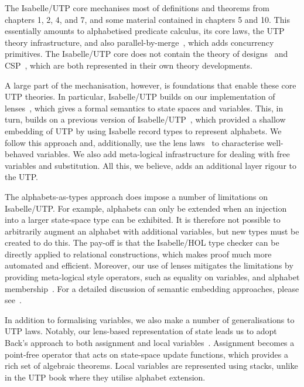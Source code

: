 \documentclass[11pt,a4paper]{article}
\begin{document}
The Isabelle/UTP core mechanises most of definitions and theorems from chapters 1, 2, 4, and 7, and some material
contained in chapters 5 and 10. This essentially amounts to alphabetised predicate calculus, its core laws, the UTP
theory infrastructure, and also parallel-by-merge~\cite[chapter~5]{Hoare&98}, which adds concurrency primitives. The
Isabelle/UTP core does not contain the theory of designs~\cite{Cavalcanti04} and CSP~\cite{Cavalcanti&06}, which are
both represented in their own theory developments.

A large part of the mechanisation, however, is foundations that enable these core UTP theories. In particular,
Isabelle/UTP builds on our implementation of lenses~\cite{Foster16a,Optics-AFP}, which gives a formal semantics to state
spaces and variables. This, in turn, builds on a previous version of Isabelle/UTP~\cite{Feliachi2010,Feliachi2012},
which provided a shallow embedding of UTP by using Isabelle record types to represent alphabets. We follow this approach
and, additionally, use the lens laws~\cite{Foster09,Foster16a} to characterise well-behaved variables. We also add
meta-logical infrastructure for dealing with free variables and substitution. All this, we believe, adds an additional
layer rigour to the UTP.

The alphabets-as-types approach does impose a number of limitations on Isabelle/UTP. For example, alphabets can only be
extended when an injection into a larger state-space type can be exhibited. It is therefore not possible to arbitrarily
augment an alphabet with additional variables, but new types must be created to do this. The pay-off is that the
Isabelle/HOL type checker can be directly applied to relational constructions, which makes proof much more automated and
efficient. Moreover, our use of lenses mitigates the limitations by providing meta-logical style operators, such as
equality on variables, and alphabet membership~\cite{Foster16a}. For a detailed discussion of semantic embedding
approaches, please see~\cite{Foster16c}.

In addition to formalising variables, we also make a number of generalisations to UTP laws. Notably, our lens-based
representation of state leads us to adopt Back's approach to both assignment and local
variables~\cite{Back1998}. Assignment becomes a point-free operator that acts on state-space update functions, which
provides a rich set of algebraic theorems. Local variables are represented using stacks, unlike in the UTP book where
they utilise alphabet extension.
\end{document}
